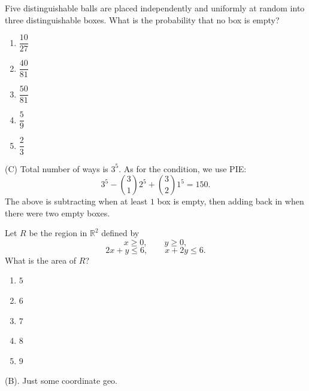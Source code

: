 \begin{exercise}
Five distinguishable balls are placed independently and uniformly at random
into three distinguishable boxes. What is the probability that no box is empty?
\begin{enumerate}[label=(\Alph*)]
    \item $\dfrac{10}{27}$
    \item $\dfrac{40}{81}$
    \item $\dfrac{50}{81}$
    \item $\dfrac59$
    \item $\dfrac23$
\end{enumerate}
\end{exercise}
\begin{solution}
(C) Total number of ways is $3^5$. As for the condition, we use PIE:
\[
3^5 - {3\choose 1} 2^5 + {3 \choose 2} 1^5 
= 150.
\]
The above is subtracting when at least $1$ box is empty, then adding back in 
when there were two empty boxes.
\end{solution}


\begin{exercise}
Let $R$ be the region in $\mathbb R^2$
defined by
\[
x\ge0,\qquad y\ge0,
\]
\[
2x+y\le6,\qquad x+2y\le6.
\]
What is the area of $R$?
\begin{enumerate}[label=(\Alph*)]
    \item $5$
    \item $6$
    \item $7$
    \item $8$
    \item $9$
\end{enumerate}
\end{exercise}
\begin{solution}
(B). Just some coordinate geo.
\end{solution}


